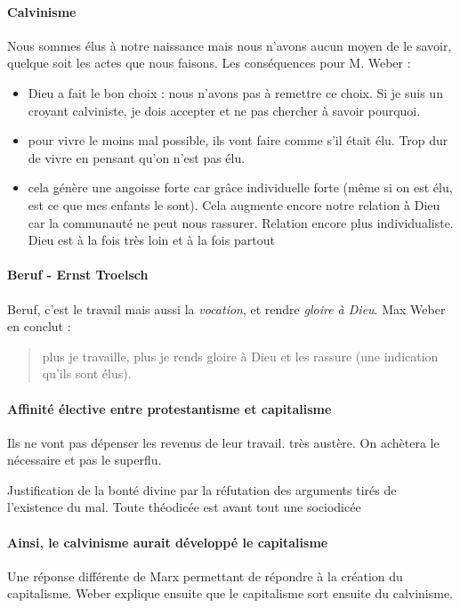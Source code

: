 \paragraph{Calvinisme} Nous sommes élus à notre naissance mais nous n'avons aucun moyen de le savoir, quelque soit les actes que nous faisons. Les conséquences pour M. Weber : 
\begin{itemize}
    \item Dieu a fait le bon choix : nous n'avons pas à remettre ce choix. Si je suis un croyant calviniste, je dois accepter et ne pas chercher à savoir pourquoi.
    \item pour vivre le moins mal possible, ils vont faire comme s'il était élu. Trop dur de vivre en pensant qu'on n'est pas élu.
    \item cela génère une angoisse forte car grâce individuelle forte (même si on est élu, est ce que mes enfants le sont). Cela augmente encore notre relation à Dieu car la communauté ne peut nous rassurer. Relation encore plus individualiste. Dieu est à la fois très loin et à la fois partout
\end{itemize}


\paragraph{Beruf - Ernst Troelsch} Beruf, c'est le travail mais aussi la \textit{vocation}, et rendre \textit{gloire à Dieu}. Max Weber en conclut : 
\begin{quote}
    plus je travaille, plus je rends gloire à Dieu et les rassure (une indication qu'ils sont élus).
\end{quote}
\paragraph{Affinité élective entre protestantisme et capitalisme}  Ils ne vont pas dépenser les revenus de leur travail. très austère. On achètera le nécessaire et pas le superflu.

\begin{Def}[théodicée]
Justification de la bonté divine par la réfutation des arguments tirés de l'existence du mal.
Toute théodicée est avant tout une sociodicée

\end{Def}

\paragraph{Ainsi, le calvinisme aurait développé le capitalisme} Une réponse différente de Marx permettant de répondre à la création du capitalisme. Weber explique ensuite que le capitalisme sort ensuite du calvinisme.


